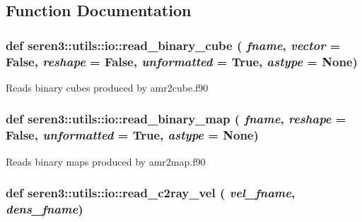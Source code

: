 \subsection{Function Documentation}
\hypertarget{namespaceseren3_1_1utils_1_1io_a37631863791c31ac718b62e18acb9083}{
\subsubsection[{read\_\-binary\_\-cube}]{\setlength{\rightskip}{0pt plus 5cm}def seren3::utils::io::read\_\-binary\_\-cube ( {\em fname}, \/   {\em vector} = {\ttfamily False}, \/   {\em reshape} = {\ttfamily False}, \/   {\em unformatted} = {\ttfamily True}, \/   {\em astype} = {\ttfamily None})}}
\label{namespaceseren3_1_1utils_1_1io_a37631863791c31ac718b62e18acb9083}
\begin{DoxyVerb}
Reads binary cubes produced by amr2cube.f90
\end{DoxyVerb}
 \hypertarget{namespaceseren3_1_1utils_1_1io_ad0a0bc5bc270cfe1dfad10eb50018501}{
\subsubsection[{read\_\-binary\_\-map}]{\setlength{\rightskip}{0pt plus 5cm}def seren3::utils::io::read\_\-binary\_\-map ( {\em fname}, \/   {\em reshape} = {\ttfamily False}, \/   {\em unformatted} = {\ttfamily True}, \/   {\em astype} = {\ttfamily None})}}
\label{namespaceseren3_1_1utils_1_1io_ad0a0bc5bc270cfe1dfad10eb50018501}
\begin{DoxyVerb}
Reads binary maps produced by amr2map.f90
\end{DoxyVerb}
 \hypertarget{namespaceseren3_1_1utils_1_1io_a00c3cdbfb36d9c2090f1ab760e1acddb}{
\subsubsection[{read\_\-c2ray\_\-vel}]{\setlength{\rightskip}{0pt plus 5cm}def seren3::utils::io::read\_\-c2ray\_\-vel ( {\em vel\_\-fname}, \/   {\em dens\_\-fname})}}
